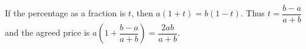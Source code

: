 If the percentage as a fraction is $t$, then $a(1+t)=b(1-t)$. Thus $t=\dfrac{b-a}{a+b}$ and the agreed price is $a\left(1+\dfrac{b-a}{a+b}\right)=\boxed{\dfrac{2ab}{a+b}}$.

